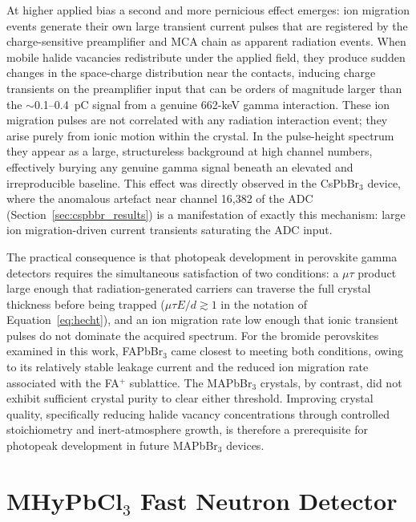 At higher applied bias a second and more pernicious effect
emerges: ion migration events generate their own large transient
current pulses that are registered by the charge-sensitive
preamplifier and MCA chain as apparent radiation events.  When
mobile halide vacancies redistribute under the applied field,
they produce sudden changes in the space-charge distribution
near the contacts, inducing charge transients on the preamplifier
input that can be orders of magnitude larger than the
$\sim$0.1--0.4~pC signal from a genuine 662-keV gamma
interaction.  These ion migration pulses are not correlated with
any radiation interaction event; they arise purely from ionic
motion within the crystal.  In the pulse-height spectrum they
appear as a large, structureless background at high channel
numbers, effectively burying any genuine gamma signal beneath an
elevated and irreproducible baseline.  This effect was directly
observed in the CsPbBr$_3$ device, where the anomalous artefact
near channel 16,382 of the ADC
(Section~\ref{sec:cspbbr_results}) is a manifestation of exactly
this mechanism: large ion migration-driven current transients
saturating the ADC input.

The practical consequence is that photopeak development in
perovskite gamma detectors requires the simultaneous satisfaction
of two conditions: a $\mu\tau$ product large enough that
radiation-generated carriers can traverse the full crystal
thickness before being trapped
($\mu\tau E / d \gtrsim 1$ in the notation of
Equation~\ref{eq:hecht}), and an ion migration rate low enough
that ionic transient pulses do not dominate the acquired
spectrum.  For the bromide perovskites examined in this work,
FAPbBr$_3$ came closest to meeting both conditions, owing to its
relatively stable leakage current and the reduced ion migration
rate associated with the FA$^+$ sublattice.  The MAPbBr$_3$
crystals, by contrast, did not exhibit sufficient crystal purity
to clear either threshold.  Improving crystal quality,
specifically reducing halide vacancy concentrations through
controlled stoichiometry and inert-atmosphere growth, is
therefore a prerequisite for photopeak development in future
MAPbBr$_3$ devices.


\section{MHyPbCl$_3$ Fast Neutron Detector}
\label{sec:neutron_detector}

